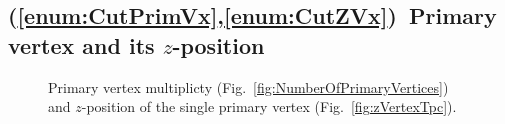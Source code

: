 \subsection{(\ref{enum:CutPrimVx},\ref{enum:CutZVx})~Primary vertex and its \texorpdfstring{$z$}{z}-position}

\begin{figure}[ht!]
\centering
\parbox{0.4\textwidth}{
  \centering
  \begin{subfigure}[b]{\linewidth}{
                }
  \end{subfigure}
}
\quad
\parbox{0.545\textwidth}{
  \centering
  \begin{subfigure}[b]{\linewidth}{
                }
  \end{subfigure}
}%
\caption[Primary vertex multiplicty and \texorpdfstring{$z$}{z}-position of the single primary vertex.]{Primary vertex multiplicty (Fig.~\ref{fig:NumberOfPrimaryVertices}) and \texorpdfstring{$z$}{z}-position of the single primary vertex (Fig.~\ref{fig:zVertexTpc}).}
\end{figure}

